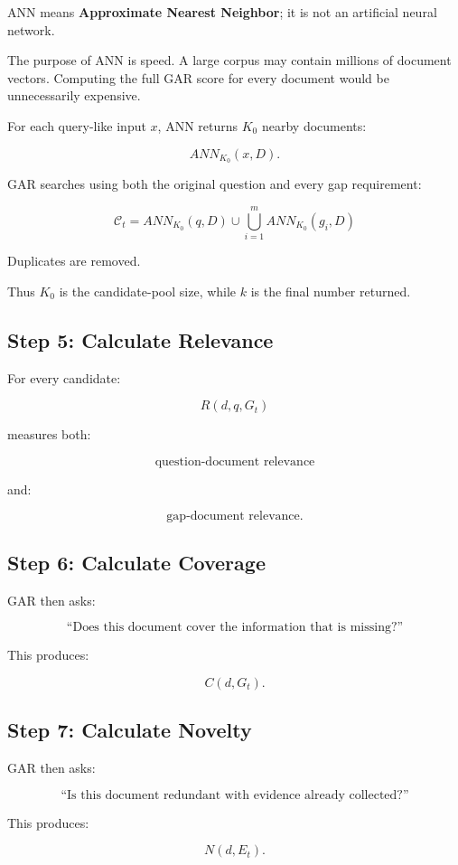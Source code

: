 \documentclass[11pt,a4paper]{article}
\begin{document}
ANN means \textbf{Approximate Nearest Neighbor}; it is not an artificial neural network.

The purpose of ANN is speed. A large corpus may contain millions of document vectors. Computing the full GAR score for every document would be unnecessarily expensive.

For each query-like input $x$, ANN returns $K_0$ nearby documents:

\[
ANN_{K_0}(x,D).
\]

GAR searches using both the original question and every gap requirement:

\[
\boxed{
\mathcal{C}_t
=
ANN_{K_0}(q,D)
\cup
\bigcup_{i=1}^{m}
ANN_{K_0}(g_i,D)
}
\tag{10}
\]

Duplicates are removed.

Thus $K_0$ is the candidate-pool size, while $k$ is the final number returned.

\subsection{Step 5: Calculate Relevance}

For every candidate:

\[
R(d,q,G_t)
\]

measures both:

\[
\text{question-document relevance}
\]

and:

\[
\text{gap-document relevance}.
\]

\subsection{Step 6: Calculate Coverage}

GAR then asks:

\[
\text{``Does this document cover the information that is missing?''}
\]

This produces:

\[
C(d,G_t).
\]

\subsection{Step 7: Calculate Novelty}

GAR then asks:

\[
\text{``Is this document redundant with evidence already collected?''}
\]

This produces:

\[
N(d,E_t).
\]
\end{document}
